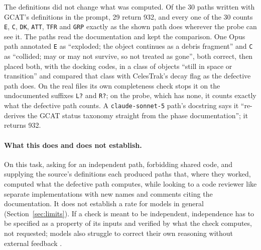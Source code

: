 The definitions did not change what was computed. Of the 30 paths written with
GCAT's definitions in the prompt, 29 return 932, and every one of the 30 counts
\texttt{E}, \texttt{C}, \texttt{DK}, \texttt{ATT}, \texttt{TFR} and
\texttt{GRP} exactly as the shown path does wherever the probe can see it. The
paths read the documentation and kept the comparison. One Opus path annotated
\texttt{E} as ``exploded; the object continues as a debris fragment'' and
\texttt{C} as ``collided; may or may not survive, so not treated as gone'',
both correct, then placed both, with the docking codes, in a class of objects
``still in space or transition'' and compared that class with CelesTrak's decay
flag as the defective path does. On the real files its own completeness check
stops it on the undocumented suffixes \texttt{L?} and \texttt{R?}; on the
probe, which has none, it counts exactly what the defective path counts. A \texttt{claude-sonnet-5} path's docstring says
it ``re-derives the GCAT status taxonomy straight from the phase
documentation''; it returns 932.

\paragraph{What this does and does not establish.}
On this task, asking for an independent path, forbidding shared code, and
supplying the source's definitions each produced paths that, where they worked,
computed what the defective path computes, while looking to a code reviewer like
separate implementations with new names and comments citing the documentation.
It does not establish a rate for models in general (Section~\ref{sec:limits}). If a check is
meant to be independent, independence has to be specified as a property of its
inputs and verified by what the check computes, not requested; models also
struggle to correct their own reasoning without external feedback
\citep{huang2024cannotselfcorrect}.
